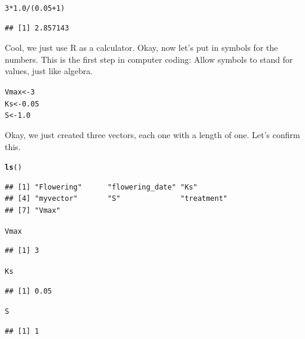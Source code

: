 \documentclass{tufte-handout}\usepackage[]{graphicx}\usepackage[]{color}
\makeatletter
\newcommand{\hlnum}[1]{\textcolor[rgb]{0.686,0.059,0.569}{#1}}%
\newcommand{\hlopt}[1]{\textcolor[rgb]{0,0,0}{#1}}%
\newcommand{\hlstd}[1]{\textcolor[rgb]{0.345,0.345,0.345}{#1}}%
\newcommand{\hlkwb}[1]{\textcolor[rgb]{0.69,0.353,0.396}{#1}}%
\newcommand{\hlkwd}[1]{\textcolor[rgb]{0.737,0.353,0.396}{\textbf{#1}}}%
\newenvironment{kframe}{%
 \def\at@end@of@kframe{}%
 \ifinner\ifhmode%
  \def\at@end@of@kframe{\end{minipage}}%
  \begin{minipage}{\columnwidth}%
 \fi\fi%
 \def\FrameCommand##1{\hskip\@totalleftmargin \hskip-\fboxsep
 \colorbox{shadecolor}{##1}\hskip-\fboxsep
     \hskip-\linewidth \hskip-\@totalleftmargin \hskip\columnwidth}%
 \MakeFramed {\advance\hsize-\width
   \@totalleftmargin\z@ \linewidth\hsize
   \@setminipage}}%
 {\par\unskip\endMakeFramed%
 \at@end@of@kframe}
\newenvironment{knitrout}{}{} %
\makeatother
\begin{document}
\begin{knitrout}
\color{fgcolor}\begin{kframe}
\begin{alltt}
\hlnum{3}\hlopt{*}\hlnum{1.0}\hlopt{/}\hlstd{(}\hlnum{0.05}\hlopt{+}\hlnum{1}\hlstd{)}
\end{alltt}
\begin{verbatim}
## [1] 2.857143
\end{verbatim}
\end{kframe}
\end{knitrout}

Cool, we just use R as a calculator. Okay, now let's put in symbols for the numbers. This is the first step in computer coding: Allow symbols to stand for values, just like algebra.  

\begin{knitrout}
\color{fgcolor}\begin{kframe}
\begin{alltt}
\hlstd{Vmax} \hlkwb{<-} \hlnum{3}
\hlstd{Ks} \hlkwb{<-} \hlnum{0.05}
\hlstd{S} \hlkwb{<-} \hlnum{1.0}
\end{alltt}
\end{kframe}
\end{knitrout}

Okay, we just created three vectors, each one with a length of one. Let's confirm this.

\begin{knitrout}
\color{fgcolor}\begin{kframe}
\begin{alltt}
\hlkwd{ls}\hlstd{()}
\end{alltt}
\begin{verbatim}
## [1] "Flowering"      "flowering_date" "Ks"            
## [4] "myvector"       "S"              "treatment"     
## [7] "Vmax"
\end{verbatim}
\begin{alltt}
\hlstd{Vmax}
\end{alltt}
\begin{verbatim}
## [1] 3
\end{verbatim}
\begin{alltt}
\hlstd{Ks}
\end{alltt}
\begin{verbatim}
## [1] 0.05
\end{verbatim}
\begin{alltt}
\hlstd{S}
\end{alltt}
\begin{verbatim}
## [1] 1
\end{verbatim}
\end{kframe}
\end{knitrout}
\end{document}
